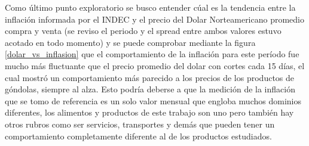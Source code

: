 Como último punto exploratorio se busco entender cúal es la tendencia entre la inflación informada por el INDEC \cite{indec} y el precio del Dolar Norteamericano \cite{cotDolar} promedio compra y venta (se reviso el periodo y el spread entre ambos valores estuvo acotado en todo momento) y se puede comprobar mediante la figura \ref{dolar_vs_inflasion} que el comportamiento de la inflación para este período fue mucho más fluctuante que el precio promedio del dolar con cortes cada 15 días, el cual mostró un comportamiento más parecido a los precios de los productos de góndolas, siempre al alza. Esto podría deberse a que la medición de la inflación que se tomo de referencia es un solo valor mensual que engloba muchos dominios diferentes, los alimentos y productos de este trabajo son uno pero también hay otros rubros como ser servicios, transportes y demás que pueden tener un comportamiento completamente diferente al de los productos estudiados.